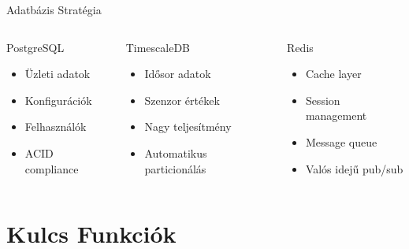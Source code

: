 \documentclass[aspectratio=169,10pt]{beamer}
\begin{document}
\begin{frame}{Adatbázis Stratégia}
    \begin{columns}[c]
        \begin{block}{PostgreSQL}
            \begin{itemize}
                \item Üzleti adatok
                \item Konfigurációk
                \item Felhasználók
                \item ACID compliance
            \end{itemize}
        \end{block}
        
        \begin{block}{TimescaleDB}
            \begin{itemize}
                \item Idősor adatok
                \item Szenzor értékek
                \item Nagy teljesítmény
                \item Automatikus particionálás
            \end{itemize}
        \end{block}
        
        \begin{block}{Redis}
            \begin{itemize}
                \item Cache layer
                \item Session management
                \item Message queue
                \item Valós idejű pub/sub
            \end{itemize}
        \end{block}
    \end{columns}
\end{frame}

\section{Kulcs Funkciók}
\end{document}
